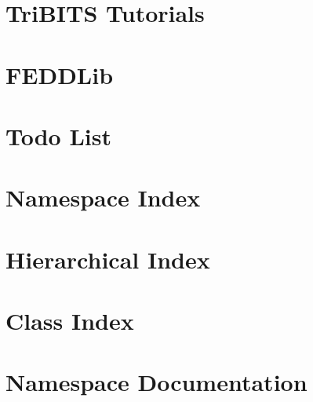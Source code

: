\let\mypdfximage\pdfximage\def\pdfximage{\immediate\mypdfximage}\documentclass[twoside]{book}
\newcommand{\+}{\discretionary{\mbox{\scriptsize$\hookleftarrow$}}{}{}}
\begin{document}
\chapter{Tri\+B\+I\+TS Tutorials}
\label{md__home_user_Programme_opt_FEDDLib_FEEDLIB_LEA_source_FEDDLib_cmake_tribits_doc_tutorial_README}

\chapter{F\+E\+D\+D\+Lib}
\label{md__home_user_Programme_opt_FEDDLib_FEEDLIB_LEA_source_FEDDLib_README}

\chapter{Todo List}
\label{todo}

\chapter{Namespace Index}

\chapter{Hierarchical Index}

\chapter{Class Index}

\chapter{Namespace Documentation}

\end{document}
